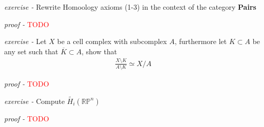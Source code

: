 \documentclass[11pt]{article}
\theoremstyle{definition}
\begin{document}

    \emph{exercise - }\label{HEx15} Rewrite Homoology axioms (1-3) in the context of the category \textbf{Pairs}

    \emph{proof - }\textcolor{red}{TODO}


    \emph{exercise - }\label{HEx16} Let \(X\) be a cell complex with subcomplex \(A\), furthermore let \(K \subset A\) be any set such that \(\overline{K} \subset A\), show that
    \begin{align*}
        \frac{X \setminus K}{A \setminus K} \simeq X/A
    \end{align*}

    \emph{proof - }\textcolor{red}{TODO}


    \emph{exercise - }\label{HEx17} Compute \(\tilde{H_i}(\mathbb{RP}^n)\)

    \emph{proof - }\textcolor{red}{TODO}
\end{document}
